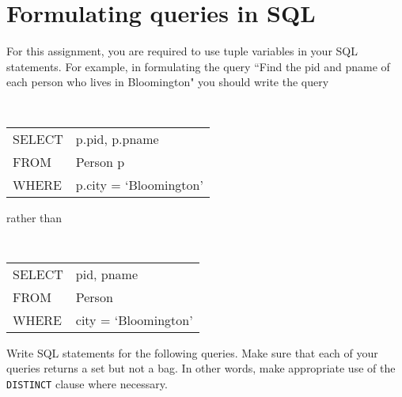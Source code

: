 \documentclass{article}
\begin{document}
  \section{Formulating queries in SQL}\label{SQLQueries}

For this assignment,  you are required to 
use  tuple variables in your SQL statements.   
For example, in formulating the query ``Find the pid and pname of each person who lives in Bloomington" you should write the query

\begin{center}{\tt
\begin{tabular}{ll}
SELECT &p.pid, p.pname\\
FROM & Person p\\
WHERE & p.city = `Bloomington'
\end{tabular}}
\end{center}
rather than
\begin{center}{\tt
\begin{tabular}{ll}
SELECT &pid, pname\\
FROM & Person\\
WHERE & city = `Bloomington' 
\end{tabular}}
\end{center}

Write SQL statements for the following queries.   
Make sure that each of your queries returns a set but not a bag.  In other words, make appropriate use of the
{\tt DISTINCT} clause where necessary.
\end{document}
